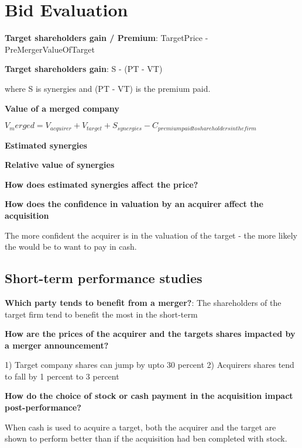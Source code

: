 \documentclass[12pt]{article}
\begin{document}
		
		\begin{framed}
			\section{Bid Evaluation}
			
			\textbf{Target shareholders gain / Premium}: TargetPrice - PreMergerValueOfTarget
			
			\textbf{Target shareholders gain}: S - (PT - VT)
			
			where S is synergies and (PT - VT) is the premium paid.
			
			\textbf{Value of a merged company}
			
			$V_merged = V_{acquirer} + V_{target} + S_{synergies} - C_{premium paid to shareholders in the firm}$
			
			\textbf{Estimated synergies}
			
			\textbf{Relative value of synergies}
			
			\textbf{How does estimated synergies affect the price?}
			
			\textbf{How does the confidence in valuation by an acquirer affect the acquisition}
			
			The more confident the acquirer is in the valuation of the target - the more likely the would be to want to pay in cash.
			
			\begin{framed}
				\section{Short-term performance studies}
				
				\textbf{Which party tends to benefit from a merger?}: The shareholders of the target firm tend to benefit the most in the short-term
				
				\textbf{How are the prices of the acquirer and the targets shares impacted by a merger announcement?}
				
				1) Target company shares can jump by upto 30 percent
				2) Acquirers shares tend to fall by 1 percent to 3 percent
				
				\textbf{How do the choice of stock or cash payment in the acquisition impact post-performance?}
				
				When cash is used to acquire a target, both the acquirer and the target are shown to perform better than if the acquisition had ben completed with stock. 
				
			\end{framed}
			

\end{framed}
\end{document}
